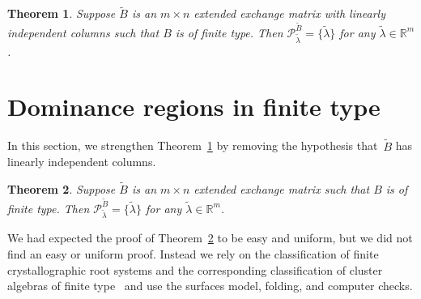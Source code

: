 \documentclass{amsart}
\newtheorem{proposition}{Proposition}[section]
\newtheorem{theorem}[proposition]{Theorem}
\theoremstyle{definition}
\theoremstyle{remark}
\numberwithin{equation}{section}
\newcommand{\reals}{\mathbb R}
\newcommand{\set}[1]{{\lbrace #1 \rbrace}}
\newcommand{\0}{{\mathbf{0}}}
\newcommand{\Cone}{\mathrm{Cone}}
\newcommand{\g}{\mathbf{g}}
\newcommand{\tB}{{\widetilde{B}}}
\renewcommand{\P}{\mathcal{P}}
\begin{document}
\begin{theorem}\label{finite P point indep}  
Suppose $\tB$ is an $m\times n$ extended exchange matrix with linearly independent columns such that $B$ is of finite type.
  Then $\P^\tB_{\tilde\lambda}=\set{\tilde\lambda}$ for any $\tilde\lambda\in\reals^m$.
\end{theorem}

%



\section{Dominance regions in finite type}\label{rescue sec}
In this section, we strengthen Theorem~\ref{finite P point indep} by removing the hypothesis that~$\tB$ has linearly independent columns.

\begin{theorem}\label{finite P point}  
Suppose $\tB$ is an $m\times n$ extended exchange matrix such that $B$ is of finite type.
  Then $\P^\tB_{\tilde\lambda}=\set{\tilde\lambda}$ for any $\tilde\lambda\in\reals^m$.
\end{theorem}

We had expected the proof of Theorem~\ref{finite P point} to be easy and uniform, but we did not find an easy or uniform proof.  
Instead we rely on the classification of finite crystallographic root systems and the corresponding classification of cluster algebras of finite type~\cite{ca2} and use the surfaces model, folding, and computer checks.
\end{document}
